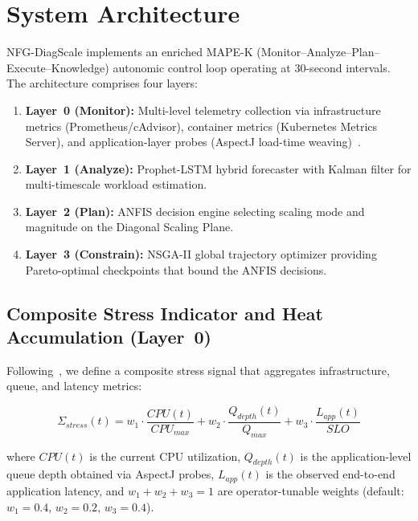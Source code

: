 \documentclass[conference]{IEEEtran}
\begin{document}
\section{System Architecture}
\label{sec:arch}

NFG-DiagScale implements an enriched MAPE-K (Monitor--Analyze--Plan--Execute--Knowledge) autonomic control loop operating at 30-second intervals. The architecture comprises four layers:

\begin{enumerate}
    \item \textbf{Layer~0 (Monitor):} Multi-level telemetry collection via infrastructure metrics (Prometheus/cAdvisor), container metrics (Kubernetes Metrics Server), and application-layer probes (AspectJ load-time weaving)~\cite{solino2025autonomic}.
    \item \textbf{Layer~1 (Analyze):} Prophet-LSTM hybrid forecaster with Kalman filter for multi-timescale workload estimation.
    \item \textbf{Layer~2 (Plan):} ANFIS decision engine selecting scaling mode and magnitude on the Diagonal Scaling Plane.
    \item \textbf{Layer~3 (Constrain):} NSGA-II global trajectory optimizer providing Pareto-optimal checkpoints that bound the ANFIS decisions.
\end{enumerate}

\subsection{Composite Stress Indicator and Heat Accumulation (Layer~0)}

Following~\cite{solino2025autonomic}, we define a composite stress signal that aggregates infrastructure, queue, and latency metrics:

\begin{equation}
\label{eq:stress}
\Sigma_{stress}(t) = w_1 \cdot \frac{CPU(t)}{CPU_{max}} + w_2 \cdot \frac{Q_{depth}(t)}{Q_{max}} + w_3 \cdot \frac{L_{app}(t)}{SLO}
\end{equation}

\noindent where $CPU(t)$ is the current CPU utilization, $Q_{depth}(t)$ is the application-level queue depth obtained via AspectJ probes, $L_{app}(t)$ is the observed end-to-end application latency, and $w_1 + w_2 + w_3 = 1$ are operator-tunable weights (default: $w_1 = 0.4$, $w_2 = 0.2$, $w_3 = 0.4$). 
\end{document}
